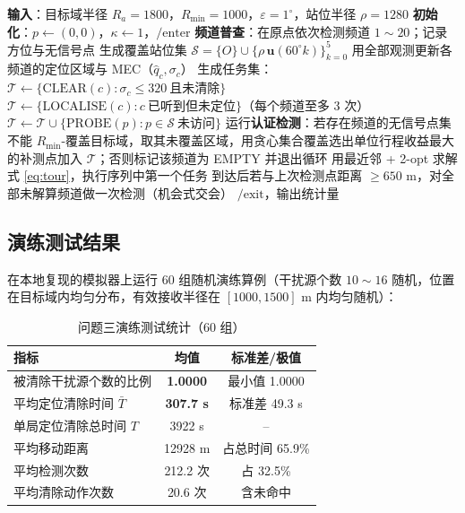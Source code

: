 \documentclass[withoutpreface,bwprint]{cumcmthesis}
\begin{document}
\begin{algorithm}[H]
\caption{问题三：全向干扰源搜索—定位—清除算法（CTC-V）}
\begin{algorithmic}[1]
\State \textbf{输入}：目标域半径 $R_a=1800$，$R_{\min}=1000$，$\varepsilon=1^{\circ}$，站位半径 $\rho=1280$
\State \textbf{初始化}：$p\gets(0,0)$，$\kappa\gets1$，$\text{/enter}$
\State \textbf{频道普查}：在原点依次检测频道 $1\sim20$；记录方位与无信号点
\State 生成覆盖站位集 $\mathcal S=\{O\}\cup\{\rho\,\mathbf u(60^{\circ}k)\}_{k=0}^{5}$
   \State 用全部观测更新各频道的定位区域与 MEC（$\hat q_c,\sigma_c$）
   \State 生成任务集：$\mathcal T\gets\{\text{CLEAR}(c):\sigma_c\le320\ \text{且未清除}\}$
      \State $\mathcal T\gets\{\text{LOCALISE}(c):c\ \text{已听到但未定位}\}$（每个频道至多 3 次）
   \EndIf
   \State $\mathcal T\gets\mathcal T\cup\{\text{PROBE}(p):p\in\mathcal S\ \text{未访问}\}$
      \State 运行\textbf{认证检测}：若存在频道的无信号点集不能 $R_{\min}$-覆盖目标域，取其未覆盖区域，用贪心集合覆盖选出单位行程收益最大的补测点加入 $\mathcal T$；否则标记该频道为 EMPTY 并退出循环
   \EndIf
   \State 用最近邻 + 2-opt 求解式 \eqref{eq:tour}，执行序列中第一个任务
   \State 到达后若与上次检测点距离 $\ge650$ m，对全部未解算频道做一次检测（机会式交会）
\EndWhile
\State $\text{/exit}$，输出统计量
\end{algorithmic}
\end{algorithm}

\subsection{演练测试结果}

在本地复现的模拟器上运行 60 组随机演练算例（干扰源个数 $10\sim16$ 随机，位置在目标域内均匀分布，有效接收半径在 $[1000,1500]$ m 内均匀随机）：

\begin{table}[H]
\centering
\caption{问题三演练测试统计（60 组）}
\label{tab:q3drill}
\begin{tabular}{lcc}
\toprule
指标 & 均值 & 标准差/极值\\
\midrule
被清除干扰源个数的比例 & \textbf{1.0000} & 最小值 1.0000\\
平均定位清除时间 $\bar T$ & \textbf{307.7 s} & 标准差 49.3 s\\
单局定位清除总时间 $T$ & 3922 s & --\\
平均移动距离 & 12928 m & 占总时间 65.9\%\\
平均检测次数 & 212.2 次 & 占 32.5\%\\
平均清除动作次数 & 20.6 次 & 含未命中\\
\bottomrule
\end{tabular}
\end{table}
\end{document}
